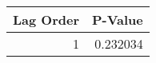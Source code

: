 \begin{tabular}{rr}
\toprule
 Lag Order &  P-Value \\
\midrule
         1 & 0.232034 \\
\bottomrule
\end{tabular}
